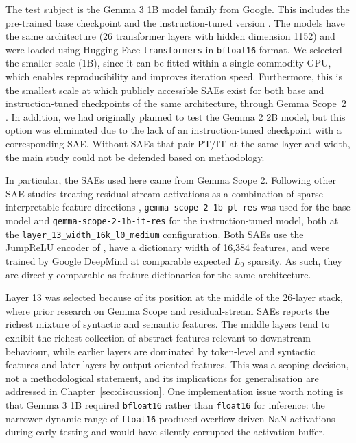 The test subject is the Gemma 3 1B model family from Google. This includes the pre-trained base checkpoint  and the instruction-tuned version  \parencite{google_gemma_3_1b_pt_hf,google_gemma_3_1b_it_hf}. The models have the same architecture (26 transformer layers with hidden dimension 1152) and were loaded using Hugging Face \texttt{transformers} in \texttt{bfloat16} format. We selected the smaller scale (1B), since it can be fitted within a single commodity GPU, which enables reproducibility and improves iteration speed. Furthermore, this is the smallest scale at which publicly accessible SAEs exist for both base and instruction-tuned checkpoints of the same architecture, through Gemma Scope~2 \parencite{mcdougall_gemma_scope_2_2025}. In addition, we had originally planned to test the Gemma 2 2B model, but this option was eliminated due to the lack of an instruction-tuned checkpoint with a corresponding SAE. Without SAEs that pair PT/IT at the same layer and width, the main study could not be defended based on methodology.

In particular, the SAEs used here came from Gemma Scope 2. Following other SAE studies treating residual-stream activations as a combination of sparse interpretable feature directions \parencite{cunningham_sparse_2023,bricken_monosemanticity_2023,elhage_toy_2022}, \texttt{gemma-scope-2-1b-pt-res} was used for the base model and \texttt{gemma-scope-2-1b-it-res} for the instruction-tuned model, both at the \texttt{layer\_13\_width\_16k\_l0\_medium} configuration. Both SAEs use the JumpReLU encoder of \textcite{rajamanoharan_improving_2024}, have a dictionary width of 16,384 features, and were trained by Google DeepMind at comparable expected $L_0$ sparsity. As such, they are directly comparable as feature dictionaries for the same architecture.

Layer 13 was selected because of its position at the middle of the 26-layer stack, where prior research on Gemma Scope and residual-stream SAEs reports the richest mixture of syntactic and semantic features. The middle layers tend to exhibit the richest collection of abstract features relevant to downstream behaviour, while earlier layers are dominated by token-level and syntactic features and later layers by output-oriented features. This was a scoping decision, not a methodological statement, and its implications for generalisation are addressed in Chapter~\ref{sec:discussion}. One implementation issue worth noting is that Gemma 3 1B required \texttt{bfloat16} rather than \texttt{float16} for inference: the narrower dynamic range of \texttt{float16} produced overflow-driven NaN activations during early testing and would have silently corrupted the activation buffer.

